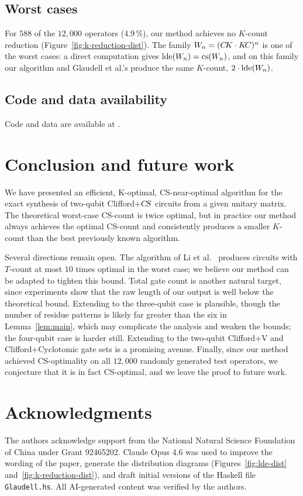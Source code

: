 \documentclass[reprint,amsmath,amssymb,aps,pra]{revtex4-2}
\begin{document}
\subsection{Worst cases}
For $588$ of the $12{,}000$ operators ($4.9\,\%$), our method achieves
no $K$-count reduction (Figure~\ref{fig:k-reduction-dist}). The family
$W_n = (C\kern-.16667em K \cdot K\kern-.16667em C)^n$ is one of the worst cases: a direct
computation gives $\operatorname{lde}(W_n) = \operatorname{cs}(W_n)$, and on this family our
algorithm and Glaudell et al.'s produce the same $K$-count,
$2 \cdot \operatorname{lde}(W_n)$.

\subsection{Code and data availability}
\label{sec:code}

Code and data are available at \cite{Bian_Kopt}.

\section{Conclusion and future work}

We have presented an efficient, K-optimal, CS-near-optimal algorithm
for the exact synthesis of two-qubit Clifford+$C\kern-.16667em S$ circuits from a
given unitary matrix. The theoretical worst-case CS-count is twice
optimal, but in practice our method always achieves the optimal
CS-count and consistently produces a smaller $K$-count than the best
previously known algorithm.

Several directions remain open. The algorithm of Li et al.\
\cite{Li_2023_CT2} produces circuits with $T$-count at most $10$ times
optimal in the worst case; we believe our method can be adapted to
tighten this bound. Total gate count is another natural target, since
experiments show that the raw length of our output is well below the
theoretical bound. Extending to the three-qubit case is plausible,
though the number of residue patterns is likely far greater than the
six in Lemma~\ref{lem:main}, which may complicate the analysis and
weaken the bounds; the four-qubit case is harder still. Extending to
the two-qubit Clifford+V and Clifford+Cyclotomic gate sets is a
promising avenue. Finally, since our method achieved CS-optimality on
all $12{,}000$ randomly generated test operators, we conjecture that
it is in fact CS-optimal, and we leave the proof to future work.

\section{Acknowledgments}
The authors acknowledge support from the National Natural Science
Foundation of China under Grant 92465202. Claude Opus 4.6 was used to
improve the wording of the paper, generate the distribution diagrams
(Figures~\ref{fig:lde-dist} and~\ref{fig:k-reduction-dist}), and draft
initial versions of the Haskell file \texttt{Glaudell.hs}. All
AI-generated content was verified by the authors.



\end{document}
